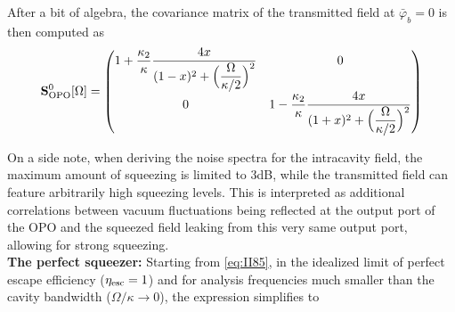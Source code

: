 After a bit of algebra, the covariance matrix of the transmitted field at $\bar \varphi_b = 0$ is then computed as
\begin{equation}
      \mathbf{S}^{0}_{\rm OPO}[\Omega] =\begin{pmatrix}
        1 + \dfrac{\kappa_2}{\kappa} \dfrac{4x}{(1- x)^2+ \Big(\dfrac{\Omega}{\kappa/2}\Big)^2} & 0 \\[10pt]
        0 & 1 - \dfrac{\kappa_2}{\kappa} \dfrac{4x}{(1+ x)^2+ \Big(\dfrac{\Omega}{\kappa/2}\Big)^2} 
      \end{pmatrix}
      \label{eq:II85}
\end{equation}




On a side note, when deriving the noise spectra for the intracavity field, the maximum amount of squeezing is limited to 3dB, while the transmitted field can feature arbitrarily high squeezing levels. This is interpreted as additional correlations between vacuum fluctuations being reflected at the output port of the OPO and the squeezed field leaking from this very same output port, allowing for strong squeezing. \\

\noindent \textbf{The perfect squeezer: } Starting from \eqref{eq:II85}, in the idealized limit of perfect escape efficiency ($\eta_{\rm esc}=1$) and for analysis frequencies much smaller than the cavity bandwidth ($\Omega/\kappa \to 0$), the expression simplifies to

